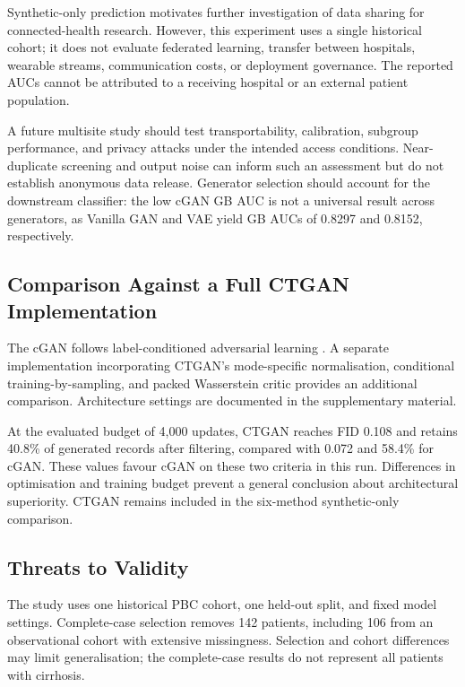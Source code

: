 \documentclass[journal]{IEEEtran}
\begin{document}
Synthetic-only prediction motivates further investigation of data sharing for connected-health research. However, this experiment uses a single historical cohort; it does not evaluate federated learning, transfer between hospitals, wearable streams, communication costs, or deployment governance. The reported AUCs cannot be attributed to a receiving hospital or an external patient population.

A future multisite study should test transportability, calibration, subgroup performance, and privacy attacks under the intended access conditions. Near-duplicate screening and output noise can inform such an assessment but do not establish anonymous data release. Generator selection should account for the downstream classifier: the low cGAN GB AUC is not a universal result across generators, as Vanilla GAN and VAE yield GB AUCs of 0.8297 and 0.8152, respectively.

\subsection{Comparison Against a Full CTGAN Implementation}
\label{sec:ctgancomp}

The cGAN follows label-conditioned adversarial learning \cite{mirza2014}. A separate implementation incorporating CTGAN's mode-specific normalisation, conditional training-by-sampling, and packed Wasserstein critic \cite{xu2019} provides an additional comparison. Architecture settings are documented in the supplementary material.

At the evaluated budget of 4,000 updates, CTGAN reaches FID 0.108 and retains 40.8\% of generated records after filtering, compared with 0.072 and 58.4\% for cGAN. These values favour cGAN on these two criteria in this run. Differences in optimisation and training budget prevent a general conclusion about architectural superiority. CTGAN remains included in the six-method synthetic-only comparison.

\subsection{Threats to Validity}

The study uses one historical PBC cohort, one held-out split, and fixed model settings. Complete-case selection removes 142 patients, including 106 from an observational cohort with extensive missingness. Selection and cohort differences may limit generalisation; the complete-case results do not represent all patients with cirrhosis.
\end{document}
